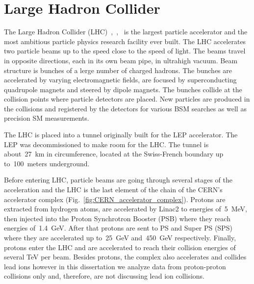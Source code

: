 \section{Large Hadron Collider}
\label{sec:Exp_LHC}

The Large Hadron Collider (LHC)~\cite{ref_LHC_brochure},~\cite{ref_LHC_TDR},~\cite{ref_LHC_website} is the largest particle accelerator and the most ambitious particle physics research facility ever built. The LHC accelerates two particle beams up to the speed close to the speed of light. The beams travel in opposite directions, each in its own beam pipe, in ultrahigh vacuum. Beam structure is bunches of a lerge number of charged hadrons. The bunches are accelerated by varying electromagnetic fields, are focused by superconducting quadrupole magnets and steered by dipole magnets. The bunches collide at the collision points where particle detectors are placed. New particles are produced in the collisions and registered by the detectors for various BSM searches as well as precision SM measurements. 


The LHC is placed into a tunnel originally built for the LEP accelerator. The LEP was decommissioned to make room for the LHC. The tunnel is about~27~km in circumference, located at the Swiss-French boundary up to~100~meters underground.

Before entering LHC, particle beams are going through several stages of the acceleration and the LHC is the last element of the chain of the CERN's accelerator complex (Fig.~\ref{fig:CERN_accelerator_complex}). Protons are extracted from hydrogen atoms, are accelerated by Linac2 to energies of~5~MeV, then injected into the Proton Synchrotron Booster (PSB) where they reach energies of~1.4~GeV. After that protons are sent to PS and Super PS (SPS) where they are accelerated up to~25~GeV and~450~GeV respectively. Finally, protons enter the LHC and are accelerated to reach their collision energies of several TeV per beam. Besides protons, the complex also accelerates and collides lead ions however in this dissertation we analyze data from proton-proton collisions only and, therefore, are not discussing lead ion collisions.    

